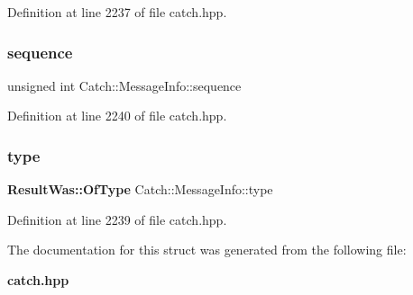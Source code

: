 Definition at line 2237 of file catch.\+hpp.

\mbox{\label{struct_catch_1_1_message_info_a7f4f57ea21e50160adefce7b68a781d6}} 
\subsubsection{sequence}
{\footnotesize\ttfamily unsigned int Catch\+::\+Message\+Info\+::sequence}



Definition at line 2240 of file catch.\+hpp.

\mbox{\label{struct_catch_1_1_message_info_ae928b9117465c696e45951d9d0284e78}} 
\subsubsection{type}
{\footnotesize\ttfamily \textbf{ Result\+Was\+::\+Of\+Type} Catch\+::\+Message\+Info\+::type}



Definition at line 2239 of file catch.\+hpp.



The documentation for this struct was generated from the following file\+:\begin{DoxyCompactItemize}
\item 
\textbf{ catch.\+hpp}\end{DoxyCompactItemize}
